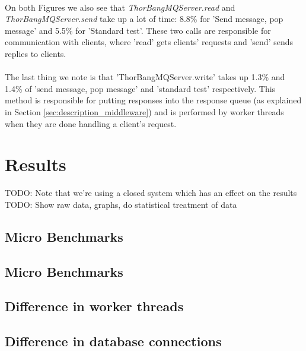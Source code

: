 \documentclass{article}
\begin{document}
            ~\\
            On both Figures we also see that \textit{ThorBangMQServer.read} and \textit{ThorBangMQServer.send} take up a lot of time: 8.8\% for 'Send message, pop message' and 5.5\% for 'Standard test'. These two calls are responsible for communication with clients, where 'read' gets clients' requests and 'send' sends replies to clients.\\
            \\
            The last thing we note is that 'ThorBangMQServer.write' takes up 1.3\% and 1.4\% of 'send message, pop message' and 'standard test' respectively. This method is responsible for putting responses into the response queue (as explained in Section \ref{sec:description_middleware}) and is performed by worker threads when they are done handling a client's request.


    \section{Results}
        TODO: Note that we're using a closed system which has an effect on the results\\
        TODO: Show raw data, graphs, do statistical treatment of data
        
        \subsection{Micro Benchmarks}

        \subsection{Micro Benchmarks}
        \subsection{Difference in worker threads}

        \subsection{Difference in database connections} 
\end{document}
